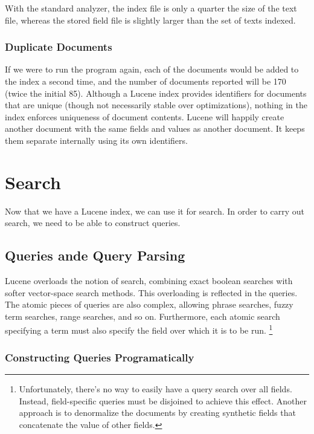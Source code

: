 With the standard analyzer, the index file is only a quarter the size of
the text file, whereas the stored field file is slightly larger than the
set of texts indexed.

\subsubsection{Duplicate Documents}

If we were to run the program again, each of the documents would be
added to the index a second time, and the number of documents reported
will be 170 (twice the initial 85).  Although a Lucene index provides
identifiers for documents that are unique (though not necessarily
stable over optimizations), nothing in the index enforces uniqueness
of document contents.  Lucene will happily create another document
with the same fields and values as another document.  It keeps them
separate internally using its own identifiers.


\section{Search}

Now that we have a Lucene index, we can use it for search.  In
order to carry out search, we need to be able to construct queries.

\subsection{Queries ande Query Parsing}

Lucene overloads the notion of search, combining exact boolean
searches with softer vector-space search methods.  This overloading is
reflected in the queries.  The atomic pieces of queries are also
complex, allowing phrase searches, fuzzy term searches, range
searches, and so on.  Furthermore, each atomic search specifying a
term must also specify the field over which it is to be run.%
%
\footnote{Unfortunately, there's no way to easily have a query search
  over all fields.  Instead, field-specific queries must be disjoined
  to achieve this effect.  Another approach is to denormalize the
  documents by creating synthetic fields that concatenate the value of
  other fields.}

\subsubsection{Constructing Queries Programatically}

